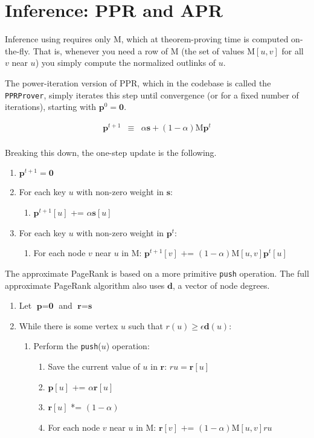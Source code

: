 \documentclass[12pt]{article}
\newcommand{\vek}[1]{\textbf{#1}}
\newcommand{\M}{\textrm{M}}
\begin{document}
\section{Inference: PPR and APR}

Inference using requires only $\M$, which at theorem-proving time is
computed on-the-fly.  That is, whenever you need a row of $\M$ (the
set of values $\M[u,v]$ for all $v$ near $u$) you simply compute the
normalized outlinks of $u$.

The power-iteration version of PPR, which in the codebase is called
the \texttt{PPRProver}, simply iterates this step until convergence
(or for a fixed number of iterations), starting with
$\vek{p}^0=\vek{0}$.

\begin{eqnarray}
\vek{p}^{t+1} & \equiv & \alpha \vek{s} + (1-\alpha) \M \vek{p}^t \\
\end{eqnarray}

Breaking this down, the one-step update is the following.

\begin{enumerate}
\item $\vek{p}^{t+1} = \vek{0}$
\item For each key $u$ with non-zero weight in $\vek{s}$:
  \begin{enumerate}
  \item $\vek{p}^{t+1}[u]$ += $\alpha \vek{s}[u]$
  \end{enumerate}
\item For each key $u$ with non-zero weight in $\vek{p}^t$:
  \begin{enumerate}
  \item For each node $v$ near $u$ in $\M$:
\(
       \vek{p}^{t+1}[v] \mbox{~+=~} (1-\alpha) \M[u,v] \vek{p}^t[u]
\)
  \end{enumerate}
\end{enumerate}

The approximate PageRank is based on a more primitive \texttt{push}
operation.  The full approximate PageRank algorithm also uses
$\vek{d}$, a vector of node degrees.

\begin{enumerate}
\item Let $\vek{p}= \vek{0}$ and $\vek{r}= \vek{s}$
\item While there is some vertex $u$ such that $r(u)\geq{}\epsilon
  \vek{d}(u)$:
  \begin{enumerate}
  \item Perform the \texttt{push}($u$) operation:
    \begin{enumerate}
      \item Save the current value of $u$ in $\vek{r}$: $ru = \vek{r}[u]$
      \item $\vek{p}[u]$ += $\alpha \vek{r}[u]$
      \item $\vek{r}[u]$ *= $(1-\alpha)$
      \item For each node $v$ near $u$ in $\M$:
\(
       \vek{r}[v] \mbox{~+=~} (1-\alpha) \M[u,v] ru
\)
    \end{enumerate}
  \end{enumerate}
\end{enumerate}
\end{document}
